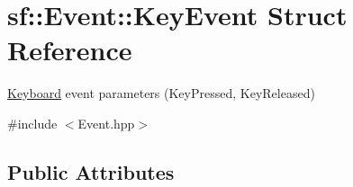 \hypertarget{structsf_1_1_event_1_1_key_event}{\section{sf\+:\+:Event\+:\+:Key\+Event Struct Reference}
\label{structsf_1_1_event_1_1_key_event}
}


\hyperlink{classsf_1_1_keyboard}{Keyboard} event parameters (Key\+Pressed, Key\+Released)  




{\ttfamily \#include $<$Event.\+hpp$>$}

\subsection*{Public Attributes}
